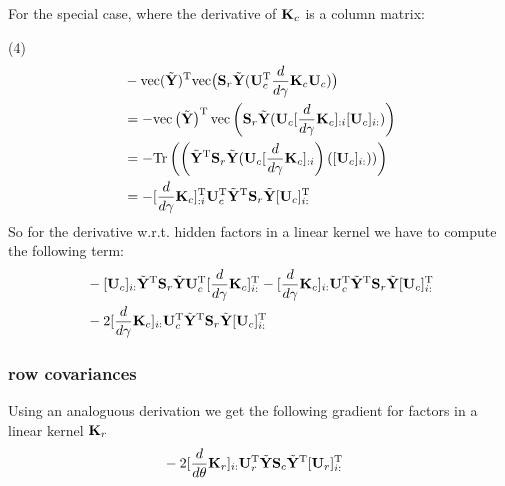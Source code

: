 \documentclass{article}
\newcommand{\B}[1]{{\bf{#1}}}
\begin{document}
For the special case, where the derivative of $\B{K}_c$ is a column matrix:

(4)\
\begin{align*}&
-\col (\tilde\bfY) ^{\T}\col \big(\B{S}_r\tilde\bfY (\B{U}_c^{\T}
\dg \B{K}_c \B{U}_c)\big)\\&
=- \col\left({\tilde\bfY}\right)^{\T}
\col\left({\B{S}_r\tilde\bfY (\B{U}_c
[\dg \B{K}_c]_{:i} [\B{U}_c]_{i:})}\right)
\\&
=- \Tr\left(\left({\tilde\bfY}^{\T}
\B{S}_r\tilde\bfY (\B{U}_c
[\dg \B{K}_c]_{:i}\right)\left( [\B{U}_c]_{i:})\right) \right)
\\&
=-
{[\dg \B{K}_c]_{:i}^{\T}\B{U}_c^{\T}\tilde\bfY^{\T} \B{S}_r \tilde\bfY}
[\B{U}_c]_{i:}^{\T}
\end{align*}
So for the derivative w.r.t. hidden factors in a linear kernel we have to compute the
following term:
\begin{align*}&
-{[\B{U}_c]_{i:}\tilde\bfY^{\T} \B{S}_r \tilde\bfY}
\B{U}_c^{\T} [\dg \B{K}_c]_{i:}^{\T}
-{[\dg \B{K}_c]_{i:}\B{U}_c^{\T}\tilde\bfY^{\T} \B{S}_r \tilde\bfY}
[\B{U}_c]_{i:}^{\T}
\\&
-2 {[\dg \B{K}_c]_{i:}\B{U}_c^{\T}\tilde\bfY^{\T} \B{S}_r \tilde\bfY}
[\B{U}_c]_{i:}^{\T}
\end{align*}
\subsubsection{row covariances}
Using an analoguous derivation we get the following gradient for factors in a linear kernel $\B{K}_r$
\begin{align*}&
-2 {[\dt \B{K}_r]_{i:}\B{U}_r^{\T}\tilde\bfY \B{S}_c \tilde\bfY^{\T}}
[\B{U}_r]_{i:}^{\T}
\end{align*}
\end{document}
